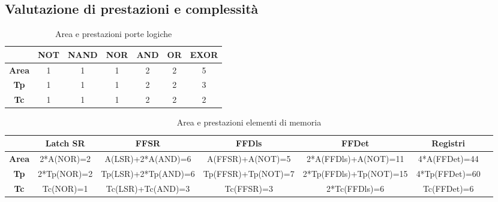 \documentclass[10pt]{article}
\begin{document}
\begin{itemize}
\subsection{Valutazione di prestazioni e complessità}

\begin{table}[H]
    \begin{minipage}[c]{\textwidth}
    \centering
    \begin{tabular}{|c|c|c|c|c|c|c|}
    \hline
                  & \textbf{NOT} & \textbf{NAND} & \textbf{NOR} & \textbf{AND} & \textbf{OR} & \textbf{EXOR} \\ \hline
    \textbf{Area} & 1            & 1             & 1            & 2            & 2           & 5             \\ 
    \textbf{Tp}   & 1            & 1             & 1            & 2            & 2           & 3             \\ 
    \textbf{Tc}   & 1            & 1             & 1            & 2            & 2           & 2             \\ \hline
    \end{tabular}
    \caption{Area e prestazioni porte logiche}
    \label{tab:my-table}
\end{minipage}
\end{table}

\begin{table}[H]
    \begin{minipage}[c]{\textwidth}
    \centering
    \begin{tabular}{|c|c|c|c|c|c|c|}
    \hline
                  & \textbf{Latch SR} & \textbf{FFSR}          & \textbf{FFDls}      & \textbf{FFDet}           & \textbf{Registri} \\ \hline
    \textbf{Area} & 2*A(NOR)=2        & A(LSR)+2*A(AND)=6      & A(FFSR)+A(NOT)=5    & 2*A(FFDls)+A(NOT)=11     & 4*A(FFDet)=44     \\ 
    \textbf{Tp}   & 2*Tp(NOR)=2       & Tp(LSR)+2*Tp(AND)=6    & Tp(FFSR)+Tp(NOT)=7  & 2*Tp(FFDls)+Tp(NOT)=15   & 4*Tp(FFDet)=60    \\ 
    \textbf{Tc}   & Tc(NOR)=1         & Tc(LSR)+Tc(AND)=3      & Tc(FFSR)=3          & 2*Tc(FFDls)=6            & Tc(FFDet)=6       \\ \hline
    \end{tabular}
    \caption{Area e prestazioni elementi di memoria}
    \label{tab:my-table}
\end{minipage}
\end{table}


\end{itemize}
\end{document}
